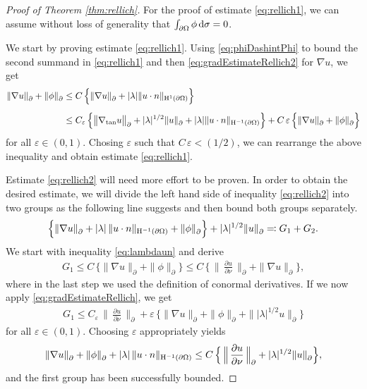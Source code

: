 \begin{proof}[Proof of Theorem \ref{thm:rellich}]
  For the proof of estimate \eqref{eq:rellich1}, we can assume without loss of generality that $\int_{\partial\Omega} \phi \, {\operatorname{d}\!{\sigma}} = 0$.

  We start by proving estimate \eqref{eq:rellich1}. 
  Using \eqref{eq:phiDashintPhi} to bound the second summand in \eqref{eq:rellich1} and then \eqref{eq:gradEstimateRellich2} for $\nabla u$, we get
  \begin{align*}
      \|\nabla u\|^{}_\partial + \|\phi\|^{}_\partial
      &\leq C\, \Big\{ \|\nabla u\|^{}_\partial + |\lambda| \|u \cdot n \|_{\mathrm{H}^1(\partial\Omega)} \Big\} \\[0.5em]
      &\leq C_\varepsilon\, \Big\{ \big\|\nabla_{\mathrm{tan}} u \big\|^{}_\partial + |\lambda|^{1/2} \|u\|^{}_\partial + |\lambda| \| u\cdot n\|_{\mathrm{H}^{-1}(\partial\Omega)} \Big\} 
      + C \,\varepsilon \,\Big\{ \|\nabla u\|^{}_\partial + \|\phi\|^{}_\partial \Big\}
  \end{align*}
  for all $\varepsilon \in (0,1)$.
  Chosing $\varepsilon$ such that $C\, \varepsilon < (1/2)$, we can rearrange the above inequality and obtain estimate \eqref{eq:rellich1}.

  Estimate \eqref{eq:rellich2} will need more effort to be proven.
  In order to obtain the desired estimate, we will divide the left hand side of inequality \eqref{eq:rellich2} into two groups as the following line suggests and then bound both groups separately.
  \begin{align*}
      \Big\{ \|\nabla u\|^{}_\partial + |\lambda|\, \|u \cdot n\|_{\mathrm{H}^{-1}(\partial\Omega)} + \|\phi\|^{}_\partial \Big\} + |\lambda|^{1/2} \|u\|^{}_\partial \eqqcolon G_1 + G_2.
  \end{align*}
  We start with inequality \eqref{eq:lambdaun} and derive
  \begin{align*}
    G_1
    \leq C\, \Big\{ \|\nabla u\|^{}_\partial + \| \phi\|^{}_\partial \Big\}
    \leq C \, \Big\{\, \Big\|\,\frac{\partial u}{\partial \nu}\, \Big\|^{}_\partial + \|\nabla u\|^{}_\partial \Big\},
  \end{align*}
  where in the last step we used the definition of conormal derivatives.
  If we now apply \eqref{eq:gradEstimateRellich}, we get
  \begin{align*}
    G_1
    \leq C_\varepsilon\, \Big\| \, \frac{\partial u}{\partial \nu} \, \Big\|^{}_\partial + \varepsilon \, \Big\{ \|\nabla u\|^{}_\partial + \|\phi\|^{}_\partial + \| |\lambda|^{1/2} u \|^{}_\partial \Big\}
  \end{align*}
  for all $\varepsilon \in (0,1)$.
  Choosing $\varepsilon$ appropriately yields
  \begin{align}
    \label{eq:partOfRellich2}
    \|\nabla u\|^{}_\partial + \|\phi\|^{}_\partial + |\lambda| \, \|u \cdot n\|_{\mathrm{H}^{-1}(\partial\Omega)}
    \leq C\, \Big\{ \, \Big\|\,\frac{\partial u}{\partial \nu} \, \Big\|^{}_\partial + |\lambda|^{1/2} \| u\|^{}_\partial \Big\},
  \end{align}
  and the first group has been successfully bounded.


\end{proof}
